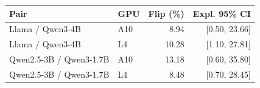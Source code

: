 \begin{tabular}{llrr}
\toprule
Pair & GPU & Flip (\%) & Expl. 95\% CI \\
\midrule
Llama / Qwen3-4B & A10 & 8.94 & [0.50, 23.66] \\
Llama / Qwen3-4B & L4 & 10.28 & [1.10, 27.81] \\
Qwen2.5-3B / Qwen3-1.7B & A10 & 13.18 & [0.60, 35.80] \\
Qwen2.5-3B / Qwen3-1.7B & L4 & 8.48 & [0.70, 28.45] \\
\bottomrule
\end{tabular}
